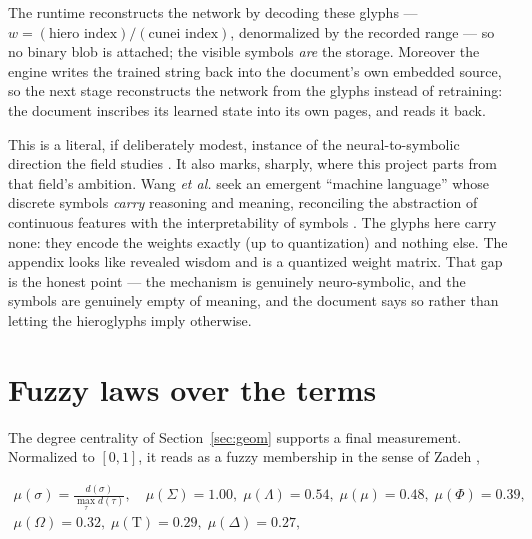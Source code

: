 \documentclass[11pt]{article}
\newcommand{\Tau}{\mathrm{T}}
\begin{document}
The runtime reconstructs the network by decoding these glyphs --- $w=(\text{hiero
index})/(\text{cunei index})$, denormalized by the recorded range --- so no binary
blob is attached; the visible symbols \emph{are} the storage. Moreover the engine
writes the trained string back into the document's own embedded source, so the next
stage reconstructs the network from the glyphs instead of retraining: the document
inscribes its learned state into its own pages, and reads it back.

This is a literal, if deliberately modest, instance of the neural-to-symbolic
direction the field studies \cite{neurosym,kgns}. It also marks, sharply, where
this project parts from that field's ambition. Wang \emph{et al.} seek an emergent
``machine language'' whose discrete symbols \emph{carry} reasoning and meaning,
reconciling the abstraction of continuous features with the interpretability of
symbols \cite{machinelang}. The glyphs here carry none: they encode the weights
exactly (up to quantization) and nothing else. The appendix looks like revealed
wisdom and is a quantized weight matrix. That gap is the honest point --- the
mechanism is genuinely neuro-symbolic, and the symbols are genuinely empty of
meaning, and the document says so rather than letting the hieroglyphs imply
otherwise.

\section{Fuzzy laws over the terms}\label{sec:fuzzy}
The degree centrality of Section~\ref{sec:geom} supports a final measurement.
Normalized to $[0,1]$, it reads as a fuzzy membership in the sense of Zadeh
\cite{zadeh},

\begin{small}
\begin{equation}
\begin{split}
\mu(\sigma)=\frac{d(\sigma)}{\max_\tau d(\tau)},\quad
\mu(\Sigma)=1.00,\;\mu(\Lambda)=0.54,\;\mu(\mu)=0.48,\;
\mu(\Phi)=0.39,\; \\
\mu(\Omega)=0.32,\;\mu(\Tau)=0.29,\;\mu(\Delta)=0.27,
\end{split}
\end{equation}
\end{small}
\end{document}
